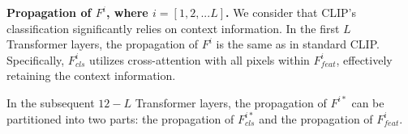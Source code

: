 

\noindent \textbf{Propagation of $F^{i}$, where $i = [1, 2, ...L]$.}
We consider that CLIP's classification significantly relies on context information. In the first $L$ Transformer layers, the propagation of $F^{i}$ is the same as in standard CLIP. Specifically, $F^{i}_{cls}$ utilizes cross-attention with all pixels within $F^{i}_{feat}$, effectively retaining the context information. 

In the subsequent $12-L$ Transformer layers, the propagation of $F^{i*}$ can be partitioned into two parts: the propagation of $F^{i*}_{cls}$ and the propagation of $F^{i}_{feat}$.

